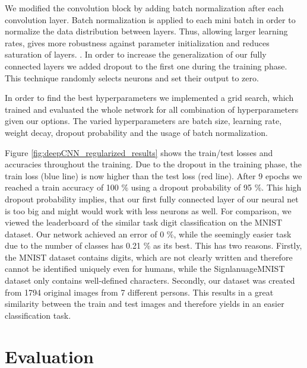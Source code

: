 \documentclass[a4paper]{article}
\begin{document}
We modified the convolution block by adding batch normalization \cite{ioffe2015batch} after each convolution layer. Batch normalization is applied to each mini batch in order to normalize the data distribution between layers. Thus, allowing larger learning rates, gives more robustness against parameter initialization and reduces saturation of layers. \cite{ioffe2015batch}. In order to increase the generalization of our fully connected layers we added dropout to the first one during the training phase. This technique randomly selects neurons and set their output to zero. 

In order to find the best hyperparameters we implemented a grid search, which trained and evaluated the whole network for all  combination of hyperparameters given our options. The varied hyperparameters are batch size, learning rate, weight decay, dropout probability and the usage of batch normalization.

Figure \ref{fig:deepCNN_regularized_results} shows the train/test losses and accuracies throughout the training. Due to the dropout in the training phase, the train loss (blue line) is now higher than the test loss (red line). After 9 epochs we reached a train accuracy of 100 \% using a dropout probability of 95 \%. This high dropout probability implies, that our first fully connected layer of our neural net is too big and might would work with less neurons as well. For comparison, we viewed the leaderboard of the similar task digit classification on the MNIST dataset. Our network achieved an error of 0 \%, while the seemingly easier task due to the number of classes has 0.21 \% as its best. This has two reasons. Firstly, the MNIST dataset contains digits, which are not clearly written and therefore cannot be identified uniquely even for humans, while the SignlanuageMNIST dataset only contains well-defined characters. Secondly, our dataset was created from 1794 original images from 7 different persons. This results in a great similarity between the train and test images and therefore yields in an easier classification task.

\section{Evaluation}
\end{document}
